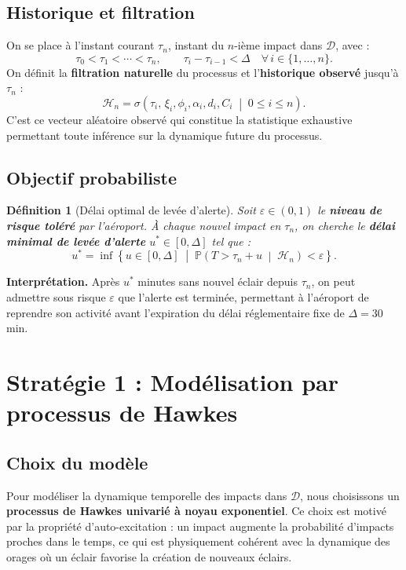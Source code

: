 \documentclass[a4paper,11pt]{article}
\newtheorem{definition}{Définition}[section]
\begin{document}
\subsection{Historique et filtration}

On se place à l'instant courant $\tau_n$, instant du $n$-ième impact dans $\mathcal{D}$, avec :
\[
\tau_0 < \tau_1 < \cdots < \tau_n, \qquad \tau_i - \tau_{i-1} < \Delta \quad \forall\, i \in \{1, \ldots, n\}.
\]
On définit la \textbf{filtration naturelle} du processus et l'\textbf{historique observé} jusqu'à $\tau_n$ :
\[
\mathcal{H}_n = \sigma\!\left( \tau_i,\, \xi_i, \phi_i, \alpha_i, d_i, C_i \;\middle|\; 0 \leq i \leq n \right).
\]
C'est ce vecteur aléatoire observé qui constitue la statistique exhaustive permettant toute inférence sur la dynamique future du processus.

\subsection{Objectif probabiliste}

\begin{definition}[Délai optimal de levée d'alerte]
Soit $\varepsilon \in (0,1)$ le \textbf{niveau de risque toléré} par l'aéroport. À chaque nouvel impact en $\tau_n$, on cherche le \textbf{délai minimal de levée d'alerte} $u^* \in [0, \Delta]$ tel que :
\[
\boxed{u^* = \inf \left\{ u \in [0, \Delta] \;\middle|\; \mathbb{P}\!\left( T > \tau_n + u \;\middle|\; \mathcal{H}_n \right) < \varepsilon \right\}.}
\]
\end{definition}

\textbf{Interprétation.} Après $u^*$ minutes sans nouvel éclair depuis $\tau_n$, on peut admettre sous risque $\varepsilon$ que l'alerte est terminée, permettant à l'aéroport de reprendre son activité avant l'expiration du délai réglementaire fixe de $\Delta = 30$ min.

\section{Stratégie 1 : Modélisation par processus de Hawkes}

\subsection{Choix du modèle}

Pour modéliser la dynamique temporelle des impacts dans $\mathcal{D}$, nous choisissons un \textbf{processus de Hawkes univarié à noyau exponentiel}. Ce choix est motivé par la propriété d'auto-excitation : un impact augmente la probabilité d'impacts proches dans le temps, ce qui est physiquement cohérent avec la dynamique des orages où un éclair favorise la création de nouveaux éclairs.
\end{document}
